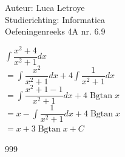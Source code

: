 \documentclass[a4paper]{article}
\begin{document}
  
\noindent \large Auteur: Luca Letroye \\
\noindent \large Studierichting: Informatica\\
\noindent \large Oefeningenreeks 4A nr. 6.9\\

\medskip
\normalsize

$\displaystyle\int \dfrac{x^2+4}{x^2+1}dx$\\

$= \displaystyle\int \dfrac{x^2}{x^2+1}dx + 4\displaystyle\int \dfrac{1}{x^2+1}dx$\\

$= \displaystyle\int \dfrac{x^2+1-1}{x^2+1}dx + 4\operatorname{Bgtan} x$\\

$= x -\displaystyle\int\dfrac{1}{x^2+1}dx + 4\operatorname{Bgtan} x$\\

$= x + 3\operatorname{Bgtan} x+C $\\




\begin{thebibliography}{999}
\end{thebibliography}
\end{document}
